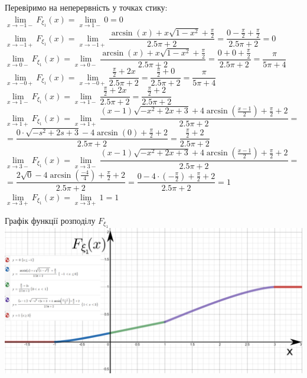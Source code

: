 \documentclass[14pt,a4paper]{scrartcl}
\theoremstyle{definition}
\theoremstyle{remark}
\theoremstyle{definition}
\theoremstyle{definition}
\begin{document}
\newpage
\vfill
Перевіримо на неперервність у точках стику:\\
$
 \lim\limits_{x\to  -1-}{ F_{\xi_1}(x)} =  \lim\limits_{x\to  1-}{ 0} =0
$\\
$
\lim\limits_{x\to  -1+}{ F_{\xi_1}(x)} =  \lim\limits_{x\to -1+}{\dfrac{\arcsin\left(x\right)+x\sqrt{1-x^2}+\frac{{\pi}}{2} }{2.5\pi + 2}} =
\dfrac{0- \frac{\pi}{2} +\frac{{\pi}}{2} }{2.5\pi + 2} = 0
$\\
$
\lim\limits_{x\to  0-}{ F_{\xi_1}(x)} = \lim\limits_{x\to 0-}{\dfrac{\arcsin\left(x\right)+x\sqrt{1-x^2}+\frac{{\pi}}{2} }{2.5\pi + 2}} = \dfrac{0+0+\frac{{\pi}}{2} }{2.5\pi + 2} = \dfrac{\pi}{5 \pi + 4}
$\\
$
\lim\limits_{x\to  -0+}{ F_{\xi_1}(x)} =  \lim\limits_{x\to  -0+}{\dfrac{\frac{{\pi}}{2} +  2x }{2.5\pi + 2}} = \dfrac{\frac{{\pi}}{2} + 0 }{2.5\pi + 2} = \dfrac{\pi}{5 \pi + 4}
$\\
$
\lim\limits_{x\to  1-}{ F_{\xi_1}(x)} =  \lim\limits_{x\to  1-}{\dfrac{\frac{{\pi}}{2} +  2x }{2.5\pi + 2}} =\dfrac{\frac{{\pi}}{2} +  2 }{2.5\pi + 2}
$\\
$
\lim\limits_{x\to  1+}{ F_{\xi_1}(x)} =  \lim\limits_{x\to 1+}{\dfrac{\left(x-1\right)\sqrt{-x^2+2x+3}+4\arcsin\left(\frac{x-1}{2}\right) + \frac{\pi}{2}+2 }{2.5\pi + 2} } =$\\$=  \dfrac{0\cdot\sqrt{-s^2+2s+3}-4\arcsin\left(0\right) + \frac{\pi}{2}+2 }{2.5\pi + 2}  = \dfrac{\frac{{\pi}}{2} +  2 }{2.5\pi + 2}
$\\
$\lim\limits_{x\to  3-}{ F_{\xi_1}(x)} =  \lim\limits_{x\to 3-}{\dfrac{\left(x-1\right)\sqrt{-x^2+2x+3}+4\arcsin\left(\frac{x-1}{2}\right) + \frac{\pi}{2}+2 }{2.5\pi + 2} } =$\\
$= \dfrac{2\sqrt{0}-4\arcsin\left(\frac{-4}{4}\right) + \frac{\pi}{2}+2 }{2.5\pi + 2} = \dfrac{0-4\cdot \left( -\frac{\pi}{2} \right)   + \frac{\pi}{2}+2 }{2.5\pi + 2} = 1$\\
$\lim\limits_{x\to  3+}{ F_{\xi_1}(x)} = \lim\limits_{x\to  3+}{1} = 1$
\vfill
\begin{center}{\large Графік функції розподілу $F_{\xi_1}$}\\
 \includegraphics[scale=0.35]{assets/Fx22.png} \end{center}
 \vfill
\end{document}
